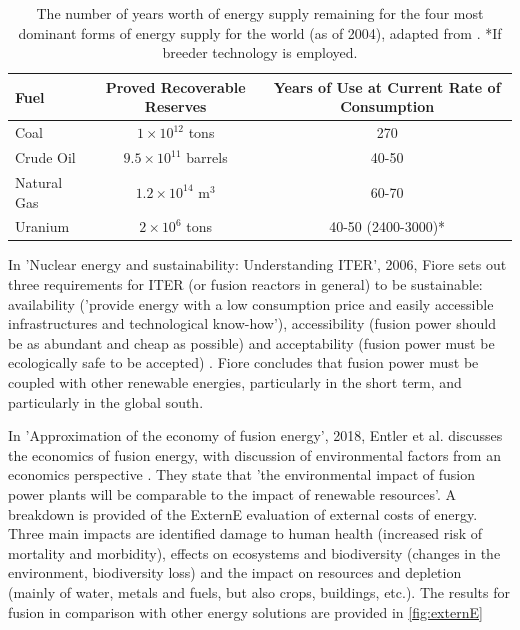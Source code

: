 \begin{table}[h!]
    \centering
    \begin{tabular}{lcc}
    \hline
       \textbf{Fuel}  & \textbf{Proved Recoverable Reserves} & \textbf{Years of Use at Current Rate of Consumption}\\
       \hline
      Coal  &$1 \times 10^{12}$ tons & 270  \\
      Crude Oil & $9.5 \times 10^{11}$ barrels & 40-50  \\
      Natural Gas & $1.2 \times 10^{14}$ m$^3$  & 60-70  \\
      Uranium & $2 \times 10^{6}$ tons  & 40-50 (2400-3000)*  \\
      \hline
    \end{tabular}
    \caption{The number of years worth of energy supply remaining for the four most dominant forms 
of energy supply for the world (as of 2004), adapted from \cite{adelerhof2014clean}. *If breeder technology is employed.}
    \label{tab:resource_supply}
\end{table}

In 'Nuclear energy and sustainability: Understanding ITER', 2006, Fiore sets out three requirements for ITER (or fusion reactors in general) to be sustainable: availability ('provide energy with a low consumption price and easily accessible infrastructures and technological know-how'), accessibility (fusion power should be as abundant and cheap as possible) and acceptability (fusion power must be ecologically safe to be accepted) \cite{fiore2006nuclear}. Fiore concludes that fusion power must be coupled with other renewable energies, particularly in the short term, and particularly in the global south.

In 'Approximation of the economy of fusion energy', 2018, Entler et al. discusses the economics of fusion energy, with discussion of environmental factors from an economics perspective \cite{entler2018approximation}. They state that 'the environmental impact of fusion power plants will be comparable to the impact of renewable resources'. A breakdown is provided of the ExternE evaluation of
external costs of energy. Three main impacts are identified damage to human health
(increased risk of mortality and morbidity), effects on ecosystems
and biodiversity (changes in the environment, biodiversity loss)
and the impact on resources and depletion (mainly of water, metals
and fuels, but also crops, buildings, etc.). The results for fusion in comparison with other energy solutions are provided in \ref{fig:externE}

